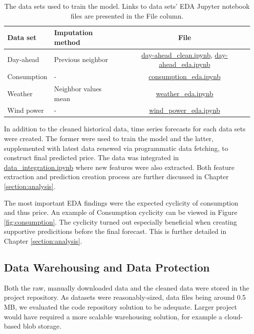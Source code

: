 \documentclass{article}
\begin{document}
\begin{table}[ht] 
\centering 
\begin{tabular}{l||l c} 
Data set & Imputation method & File\\ 
\hline \hline
Day-ahead & Previous neighbor & \href{https://github.com/IDS-mini/electricity/blob/main/data/day-ahead_clean.ipynb}{day-ahead\_clean.ipynb},  \href{https://github.com/IDS-mini/electricity/blob/main/data/day-ahead_eda.ipynb}{day-ahead\_eda.ipynb}\\
Consumption & - & \href{https://github.com/IDS-mini/electricity/blob/main/data/consumption_eda.ipynb}{consumption\_eda.ipynb} \\
Weather & Neighbor values mean & \href{https://github.com/IDS-mini/electricity/blob/main/data/weather_eda.ipynb}{weather\_eda.ipynb} \\
Wind power & - & \href{https://github.com/IDS-mini/electricity/blob/main/data/wind_power_eda.ipynb}{wind\_power\_eda.ipynb}\\
\hline
\end{tabular}
\caption{The data sets used to train the model. Links to data sets' EDA Jupyter notebook files are presented in the File column.}
\label{table:eda}
\end{table}

In addition to the cleaned historical data, time series forecasts for each data sets were created. The former were used to train the model and the latter, supplemented with latest data renewed via programmatic data fetching, to construct final predicted price. The data was integrated in \href{https://github.com/IDS-mini/electricity/blob/main/data/data_integration.ipynb}{data\_integration.ipynb} where new features were also extracted. Both feature extraction and prediction creation process are further discussed in Chapter \ref{section:analysis}.

The most important EDA findings were the expected cyclicity of consumption and thus price. An example of Consumption cyclicity can be viewed in Figure \ref{fig:consumption}. The cyclicity turned out especially beneficial when creating supportive predicitions before the final forecast. This is further detailed in Chapter \ref{section:analysis}.

\subsection{Data Warehousing and Data Protection}
\label{subsection:warehousing}

Both the raw, manually downloaded data and the cleaned data were stored in the project repository. As datasets were reasonably-sized, data files being around 0.5 MB, we evaluated the code repository solution to be adequate. Larger project would have required a more scalable warehousing solution, for example a cloud-based blob storage.
\end{document}
